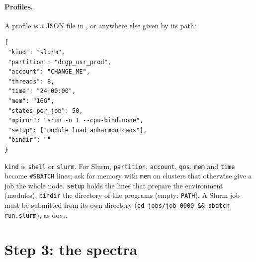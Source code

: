 \paragraph{Profiles.}\label{sec:thermal-profiles} A profile is a JSON file
in , or anywhere else given by its path:
\begin{lstlisting}
{
 "kind": "slurm",
 "partition": "dcgp_usr_prod",
 "account": "CHANGE_ME",
 "threads": 8,
 "time": "24:00:00",
 "mem": "16G",
 "states_per_job": 50,
 "mpirun": "srun -n 1 --cpu-bind=none",
 "setup": ["module load anharmonicaos"],
 "bindir": ""
}
\end{lstlisting}
\texttt{kind} is \texttt{shell} or \texttt{slurm}. For Slurm,
\texttt{partition}, \texttt{account}, \texttt{qos}, \texttt{mem} and
\texttt{time} become \texttt{\#SBATCH} lines; ask for memory with
\texttt{mem} on clusters that otherwise give a job the whole node.
\texttt{setup} holds the lines that prepare the environment (modules),
\texttt{bindir} the directory of the programs (empty: \texttt{PATH}).
A Slurm job must be submitted from its own directory
(\texttt{cd jobs/job\_0000 \&\& sbatch run.slurm}), as
 does.

\section{Step 3: the spectra}\label{sec:thermal-assemble}

